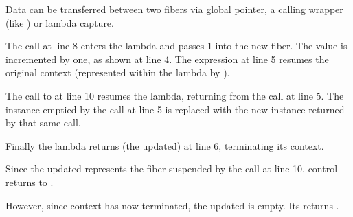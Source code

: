 
Data can be transferred between two fibers via global pointer, a calling
wrapper (like ) or lambda capture.

The \resume call at line 8 enters the lambda and passes 1 into the
new fiber. The value is incremented by one, as shown at line 4. The expression
 at line 5 resumes the original context (represented
within the lambda by ).

The call to  at line 10 resumes the lambda, returning from
the  call at line 5. The \fiber instance 
emptied by the \resume call at line 5 is replaced with the new instance
returned by that same \resume call.

Finally the lambda returns (the updated)  at line 6, terminating its
context.

Since the updated  represents the fiber suspended by the call at
line 10, control returns to \main.

However, since context  has now terminated, the updated 
is empty. Its \opbool returns .

